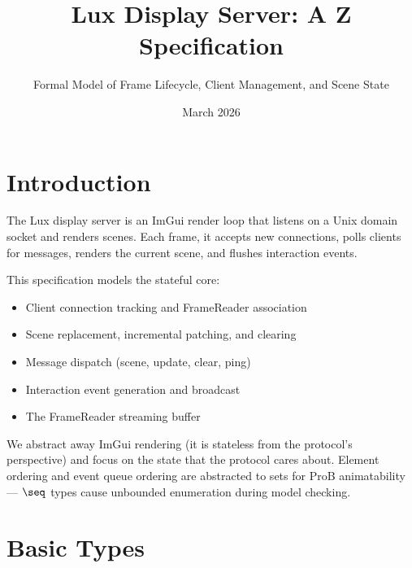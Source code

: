 \documentclass[a4paper,10pt,fleqn]{article}
\begin{document}
\title{Lux Display Server: A Z Specification}
\author{Formal Model of Frame Lifecycle, Client Management, and Scene State}
\date{March 2026}
\maketitle

\tableofcontents
\newpage

\section{Introduction}

The Lux display server is an ImGui render loop that listens on a Unix
domain socket and renders scenes.  Each frame, it accepts new
connections, polls clients for messages, renders the current scene,
and flushes interaction events.

This specification models the stateful core:
\begin{itemize}
  \item Client connection tracking and FrameReader association
  \item Scene replacement, incremental patching, and clearing
  \item Message dispatch (scene, update, clear, ping)
  \item Interaction event generation and broadcast
  \item The FrameReader streaming buffer
\end{itemize}

We abstract away ImGui rendering (it is stateless from the
protocol's perspective) and focus on the state that the protocol
cares about.  Element ordering and event queue ordering are
abstracted to sets for ProB animatability --- $\seq$ types
cause unbounded enumeration during model checking.

\section{Basic Types}

\begin{zed}
\end{zed}
\end{document}
